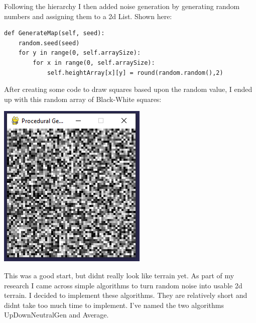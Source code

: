 \begin{flushleft}
            \vspace{0.5cm}

            Following the hierarchy I then added noise generation by generating random numbers and 
            assigning them to a 2d List. Shown here: 
            
            \begin{verbatim}
def GenerateMap(self, seed):
    random.seed(seed)
    for y in range(0, self.arraySize):
        for x in range(0, self.arraySize):
            self.heightArray[x][y] = round(random.random(),2)
            \end{verbatim}

            \vspace{0.5cm}

            \large
            After creating some code to draw squares based upon the random value, I ended up with this 
            random array of Black-White squares:\\
            \vspace{0.5cm}
            \centerline{\includegraphics{Images/Prototype/RandomNoiseExample.PNG}}

            \vspace{0.5cm}

            This was a good start, but didnt really look like terrain yet. As part of my research I came 
            across simple algorithms to turn random noise into usable 2d terrain. I decided to implement
            these algorithms. They are relatively short and didnt take too much time to implement. I've
            named the two algorithms UpDownNeutralGen and Average.

            \vspace{1cm}


\end{flushleft}
